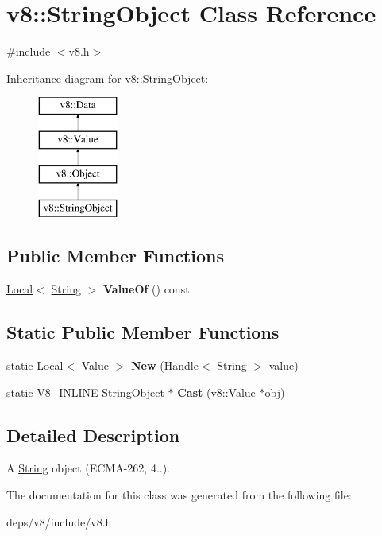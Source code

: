 \hypertarget{classv8_1_1_string_object}{}\section{v8\+:\+:String\+Object Class Reference}
\label{classv8_1_1_string_object}


{\ttfamily \#include $<$v8.\+h$>$}

Inheritance diagram for v8\+:\+:String\+Object\+:\begin{figure}[H]
\begin{center}
\leavevmode
\includegraphics[height=4.000000cm]{classv8_1_1_string_object}
\end{center}
\end{figure}
\subsection*{Public Member Functions}
\begin{DoxyCompactItemize}
\item 
\hypertarget{classv8_1_1_string_object_a96bd6c736a0272ab7e683038953077e4}{}\hyperlink{classv8_1_1_local}{Local}$<$ \hyperlink{classv8_1_1_string}{String} $>$ {\bfseries Value\+Of} () const \label{classv8_1_1_string_object_a96bd6c736a0272ab7e683038953077e4}

\end{DoxyCompactItemize}
\subsection*{Static Public Member Functions}
\begin{DoxyCompactItemize}
\item 
\hypertarget{classv8_1_1_string_object_a299c1d30b32e8bc336c8af05471a0763}{}static \hyperlink{classv8_1_1_local}{Local}$<$ \hyperlink{classv8_1_1_value}{Value} $>$ {\bfseries New} (\hyperlink{classv8_1_1_local}{Handle}$<$ \hyperlink{classv8_1_1_string}{String} $>$ value)\label{classv8_1_1_string_object_a299c1d30b32e8bc336c8af05471a0763}

\item 
\hypertarget{classv8_1_1_string_object_af2169f0b4c890196416e4d28fbf76df8}{}static V8\+\_\+\+I\+N\+L\+I\+N\+E \hyperlink{classv8_1_1_string_object}{String\+Object} $\ast$ {\bfseries Cast} (\hyperlink{classv8_1_1_value}{v8\+::\+Value} $\ast$obj)\label{classv8_1_1_string_object_af2169f0b4c890196416e4d28fbf76df8}

\end{DoxyCompactItemize}


\subsection{Detailed Description}
A \hyperlink{classv8_1_1_string}{String} object (E\+C\+M\+A-\/262, 4..). 

The documentation for this class was generated from the following file\+:\begin{DoxyCompactItemize}
\item 
deps/v8/include/v8.\+h\end{DoxyCompactItemize}
